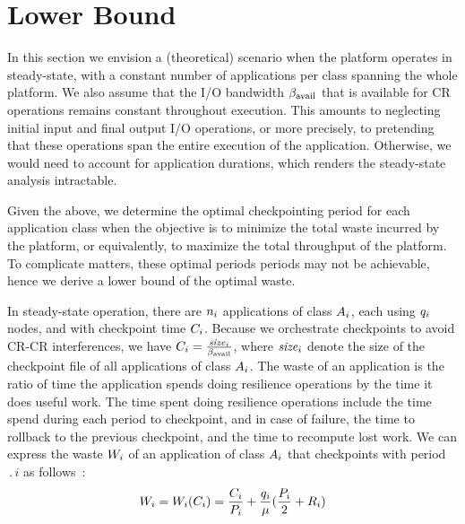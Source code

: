 
\section{Lower Bound}
\label{sec:lowerbound}

In this section we envision a (theoretical) scenario when the platform operates in steady-state,
with a constant number of applications per class spanning the whole platform. We also assume that
the I/O bandwidth $\beta_{\text{avail}}$  that is available for CR operations remains constant throughout
execution. This amounts to neglecting initial input and final output I/O operations,
or more precisely, to pretending that these operations span the entire execution of the application.
Otherwise, we would need to account for application durations, which renders the
steady-state analysis intractable. 

Given the above, we determine the optimal checkpointing period for each application class
when the objective is to minimize the total waste incurred  by the platform, or equivalently,
to maximize the total throughput of the platform. To complicate matters, these optimal periods
periods may not be achievable,  hence we derive a lower bound of the optimal waste. 

In steady-state operation, there are $n_{i}$ applications of class $A_{i}$,
each using $q_{i}$ nodes, and with checkpoint time $C_{i}$. Because we orchestrate
checkpoints to avoid CR-CR interferences, we have $C_{i} = \frac{\mathit{size}_{i}}{\beta_{\text{avail}}}$,
where $\mathit{size}_{i}$ denote the size of the checkpoint file of all applications of class $A_{i}$.
The waste of an application is the ratio of time the application spends doing
resilience operations by the time it does useful work. The time spent doing
resilience operations include the time spend during each period to checkpoint,
and in case of failure, the time to rollback to the previous checkpoint, and the
time to recompute lost work.
We
can express the waste $W_{i}$ of an application of class
$A_{i}$ that checkpoints with period $\period{i}$
as follows~\cite{springer-monograph}:
\begin{equation}
W_{i} = W_{i}(C_{i}) = \frac{C_{i}}{P_{i}} +
\frac{q_{i}}{\mu}(\frac{P_{i}}{2} + R_{i})
\label{eq.wasteAi}
\end{equation}

